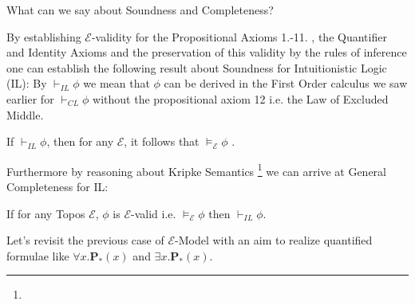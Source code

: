 What can we say about Soundness and Completeness? \newline

By establishing $\mathcal{E}$-validity for the Propositional Axioms 1.-11. , the Quantifier and Identity Axioms and the preservation of this validity by the rules of inference one can establish the following result about Soundness for Intuitionistic Logic (IL):\newline
By $\vdash_{IL} \phi $ we mean that $\phi$ can be derived in the First Order calculus we saw earlier for $\vdash_{CL} \phi$ without the propositional axiom 12 i.e. the Law of Excluded Middle.

\begin{remark}
	If $\vdash_{IL} \phi $, then for any $\mathcal{E}$, it follows that $ \vDash_\mathcal{E} \phi $ .
\end{remark}

Furthermore by reasoning about Kripke Semantics \footnote{} we can arrive at General Completeness for IL:
\begin{remark}
	If for any Topos $\mathcal{E}$, $\phi$ is $\mathcal{E}$-valid i.e. $ \vDash_\mathcal{E} \phi $ then  $\vdash_{IL} \phi $.
\end{remark}

\newpage

Let's revisit the previous case of $\mathcal{E}$-Model  with an aim to realize quantified formulae like $\forall x.\textbf{P}_* (x)$ and $\exists x.\textbf{P}_* (x)$. 


